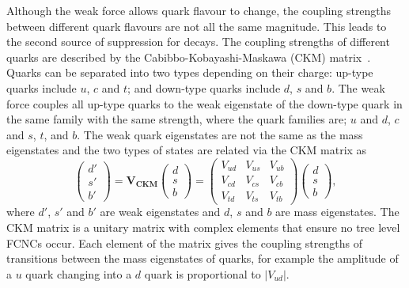 Although the weak force allows quark flavour to change, the coupling strengths between different quark flavours are not all the same magnitude. This leads to the second source of suppression for \bmumu decays. The coupling strengths of different quarks are described by the Cabibbo-Kobayashi-Maskawa (CKM) matrix~\cite{PhysRevLett.10.531,doi:10.1143/PTP.49.652}. Quarks can be separated into two types depending on their charge: up-type quarks include $u$, $c$ and $t$; and down-type quarks include $d$, $s$ and $b$. The weak force couples all up-type quarks to the weak eigenstate of the down-type quark in the same family with the same strength, where the quark families are; $u$ and $d$, $c$ and $s$, $t$, and $b$. The weak quark eigenstates are not the same as the mass eigenstates and the two types of states are related via the CKM matrix as
\begin{equation}
\begin{pmatrix}
d'\\
s'\\
b'
\end{pmatrix}
= 
\mathbf{V_{CKM}}
\begin{pmatrix}
d\\
s\\
b
\end{pmatrix} =
 \begin{pmatrix}
   V_{ud} & V_{us} & V_{ub} \\
   V_{cd} & V_{cs} & V_{cb} \\
   V_{td} & V_{ts} & V_{tb}
 \end{pmatrix}
\begin{pmatrix}
d\\
s\\
b
\end{pmatrix},
\label{eq:CKMA}
\end{equation}
where $d'$, $s'$ and $b'$ are weak eigenstates and $d$, $s$ and $b$ are mass eigenstates. The CKM matrix is a unitary matrix with complex elements that ensure no tree level FCNCs occur. Each element of the matrix gives the coupling strengths of transitions between the mass eigenstates of quarks, for example the amplitude of a $u$ quark changing into a $d$ quark is proportional to $|V_{ud}|$.

